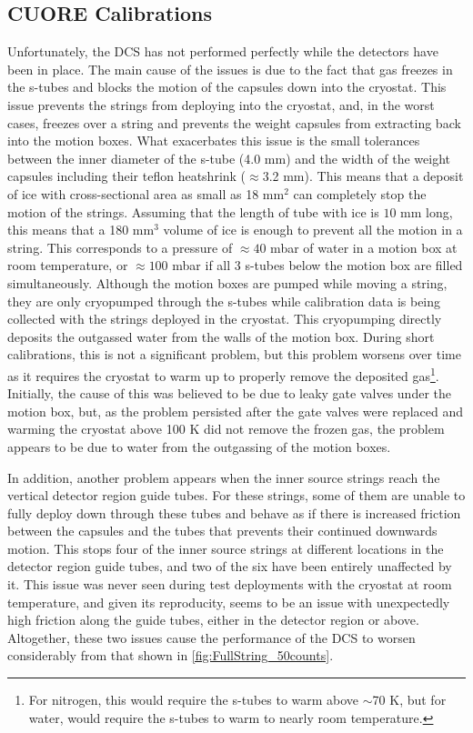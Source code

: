 \subsection*{CUORE Calibrations}
Unfortunately, the DCS has not performed perfectly while the detectors have been in place.
The main cause of the issues is due to the fact that gas freezes in the s-tubes and blocks the motion of the capsules down into the cryostat.
This issue prevents the strings from deploying into the cryostat, and, in the worst cases, freezes over a string and prevents the weight capsules from extracting back into the motion boxes.
What exacerbates this issue is the small tolerances between the inner diameter of the s-tube (4.0 mm) and the width of the weight capsules including their teflon heatshrink ($\approx$3.2 mm).
This means that a deposit of ice with cross-sectional area as small as 18 mm$^2$ can completely stop the motion of the strings.
Assuming that the length of tube with ice is $10$ mm long, this means that a 180 mm$^3$ volume of ice is enough to prevent all the motion in a string.
This corresponds to a pressure of $\approx40$ mbar of water in a motion box at room temperature, or $\approx100$ mbar if all 3 s-tubes below the motion box are filled simultaneously.
Although the motion boxes are pumped while moving a string, they are only cryopumped through the s-tubes while calibration data is being collected with the strings deployed in the cryostat.
This cryopumping directly deposits the outgassed water from the walls of the motion box.
During short calibrations, this is not a significant problem, but this problem worsens over time as it requires the cryostat to warm up to properly remove the deposited gas\footnote{For nitrogen, this would require the s-tubes to warm above $\sim$70 K, but for water, would require the s-tubes to warm to nearly room temperature.}.
Initially, the cause of this was believed to be due to leaky gate valves under the motion box, but, as the problem persisted after the gate valves were replaced and warming the cryostat above 100 K did not remove the frozen gas, the problem appears to be due to water from the outgassing of the motion boxes.

In addition, another problem appears when the inner source strings reach the vertical detector region guide tubes.
For these strings, some of them are unable to fully deploy down through these tubes and behave as if there is increased friction between the capsules and the tubes that prevents their continued downwards motion.
This stops four of the inner source strings at different locations in the detector region guide tubes, and two of the six have been entirely unaffected by it.
This issue was never seen during test deployments with the cryostat at room temperature, and given its reproducity, seems to be an issue with unexpectedly high friction along the guide tubes, either in the detector region or above.
Altogether, these two issues cause the performance of the DCS to worsen considerably from that shown in \autoref{fig:FullString_50counts}.

